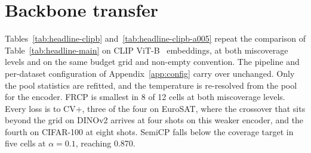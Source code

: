 %
%
%
%
\section{Backbone transfer}
\label{app:backbones}

Tables~\ref{tab:headline-clipb} and~\ref{tab:headline-clipb-a005}
repeat the comparison of Table~\ref{tab:headline-main} on CLIP
ViT-B~\citep{radford2021clip} embeddings, at both miscoverage levels
and on the same budget grid and non-empty convention. The pipeline and
per-dataset configuration of Appendix~\ref{app:config} carry over
unchanged. Only the pool statistics are refitted, and the temperature
is re-resolved from the pool for the encoder. FRCP is smallest in 8 of
12 cells at both miscoverage levels. Every loss is to CV+, three of
the four on EuroSAT, where the crossover that sits beyond the grid on
DINOv2 arrives at four shots on this weaker encoder, and the fourth on
CIFAR-100 at eight shots. SemiCP falls below the coverage target in
five cells at $\alpha = 0.1$, reaching 0.870.


